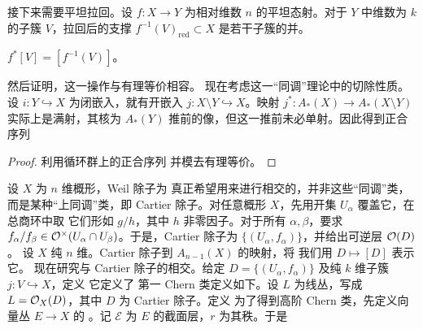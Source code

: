 接下来需要平坦拉回。设 $f:X\to Y$ 为相对维数 $n$ 的平坦态射。对于 $Y$ 中维数为 $k$ 的子簇 $V$，拉回后的支撑 $f^{-1}(V)_{\mathrm{red}}\subset X$ 是若干子簇的并。
\begin{definition}\label{def:3.3}$f^*[V]=[f^{-1}(V)]$。\end{definition}
然后证明，这一操作与有理等价相容。
现在考虑这一“同调”理论中的切除性质。设 $i:Y\hookrightarrow X$ 为闭嵌入，就有开嵌入 $j:X\setminus Y\hookrightarrow X$。映射 $j^*:A_*(X)\to A_*(X\setminus Y)$ 实际上是满射，其核为 $A_*(Y)$ 推前的像，但这一推前未必单射。因此得到正合序列
\begin{proof}
利用循环群上的正合序列
并模去有理等价。
\end{proof}
设 $X$ 为 $n$ 维概形，Weil 除子为
真正希望用来进行相交的，并非这些“同调”类，而是某种“上同调”类，即 Cartier 除子。对任意概形 $X$，先用开集 $U_\alpha$ 覆盖它，在总商环中取
它们形如 $g/h$，其中 $h$ 非零因子。对于所有 $\alpha,\beta$，要求 $f_\alpha/f_\beta\in\mathcal O^\times(U_\alpha\cap U_\beta)$。于是，Cartier 除子为 $\{(U_\alpha,f_\alpha)\}$，并给出可逆层 $\mathcal O(D)$。
设 $X$ 纯 $n$ 维。Cartier 除子到 $A_{n-1}(X)$ 的映射，将
我们用 $D\mapsto[D]$ 表示它。
现在研究与 Cartier 除子的相交。给定 $D=\{(U_\alpha,f_\alpha)\}$ 及纯 $k$ 维子簇 $j:V\hookrightarrow X$，定义
它定义了
第一 Chern 类定义如下。设 $L$ 为线丛，写成 $L=\mathcal O_X(D)$，其中 $D$ 为 Cartier 除子。定义
为了得到高阶 Chern 类，先定义向量丛 $E\to X$ 的 。记 $\mathcal E$ 为 $E$ 的截面层，$r$ 为其秩。于是
